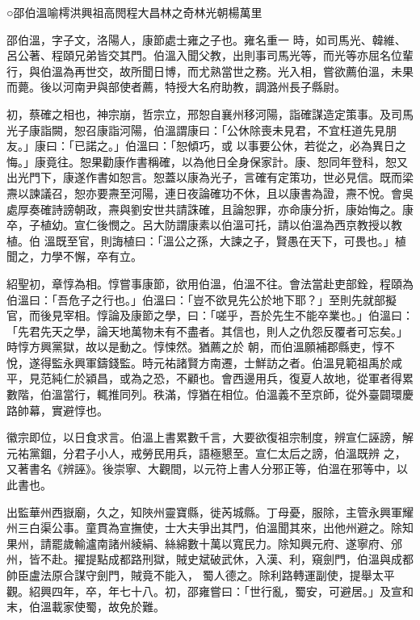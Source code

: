 
\begin{pinyinscope}

 ○邵伯溫喻樗洪興祖高閌程大昌林之奇林光朝楊萬里



 邵伯溫，字子文，洛陽人，康節處士雍之子也。雍名重一
 時，如司馬光、韓維、呂公著、程頤兄弟皆交其門。伯溫入聞父教，出則事司馬光等，而光等亦屈名位輩行，與伯溫為再世交，故所聞日博，而尤熟當世之務。光入相，嘗欲薦伯溫，未果而薨。後以河南尹與部使者薦，特授大名府助教，調潞州長子縣尉。



 初，蔡確之相也，神宗崩，哲宗立，邢恕自襄州移河陽，詣確謀造定策事。及司馬光子康詣闕，恕召康詣河陽，伯溫謂康曰：「公休除喪未見君，不宜枉道先見朋友。」康曰：「已諾之。」伯溫曰：「恕傾巧，或
 以事要公休，若從之，必為異日之悔。」康竟往。恕果勸康作書稱確，以為他日全身保家計。康、恕同年登科，恕又出光門下，康遂作書如恕言。恕蓋以康為光子，言確有定策功，世必見信。既而梁燾以諫議召，恕亦要燾至河陽，連日夜論確功不休，且以康書為證，燾不悅。會吳處厚奏確詩謗朝政，燾與劉安世共請誅確，且論恕罪，亦命康分折，康始悔之。康卒，子植幼。宣仁後憫之。呂大防謂康素以伯溫可托，請以伯溫為西京教授以教植。伯
 溫既至官，則誨植曰：「溫公之孫，大諫之子，賢愚在天下，可畏也。」植聞之，力學不懈，卒有立。



 紹聖初，章惇為相。惇嘗事康節，欲用伯溫，伯溫不往。會法當赴吏部銓，程頤為伯溫曰：「吾危子之行也。」伯溫曰：「豈不欲見先公於地下耶？」至則先就部擬官，而後見宰相。惇論及康節之學，曰：「嗟乎，吾於先生不能卒業也。」伯溫曰：「先君先天之學，論天地萬物未有不盡者。其信也，則人之仇怨反覆者可忘矣。」時惇方興黨獄，故以是動之。惇悚然。猶薦之於
 朝，而伯溫願補郡縣吏，惇不悅，遂得監永興軍鑄錢監。時元祐諸賢方南遷，士鮮訪之者。伯溫見範祖禹於咸平，見范純仁於潁昌，或為之恐，不顧也。會西邊用兵，復夏人故地，從軍者得累數階，伯溫當行，輒推同列。秩滿，惇猶在相位。伯溫義不至京師，從外臺闢環慶路帥幕，實避惇也。



 徽宗即位，以日食求言。伯溫上書累數千言，大要欲復祖宗制度，辨宣仁誣謗，解元祐黨錮，分君子小人，戒勞民用兵，語極懇至。宣仁太后之謗，伯溫既辨
 之，又著書名《辨誣》。後崇寧、大觀間，以元符上書人分邪正等，伯溫在邪等中，以此書也。



 出監華州西嶽廟，久之，知陜州靈寶縣，徙芮城縣。丁母憂，服除，主管永興軍耀州三白渠公事。童貫為宣撫使，士大夫爭出其門，伯溫聞其來，出他州避之。除知果州，請罷歲輸瀘南諸州綾絹、絲綿數十萬以寬民力。除知興元府、遂寧府、邠州，皆不赴。擢提點成都路刑獄，賊史斌破武休，入漢、利，窺劍門，伯溫與成都帥臣盧法原合謀守劍門，賊竟不能入，
 蜀人德之。除利路轉運副使，提舉太平觀。紹興四年，卒，年七十八。初，邵雍嘗曰：「世行亂，蜀安，可避居。」及宣和末，伯溫載家使蜀，故免於難。




\end{pinyinscope}
